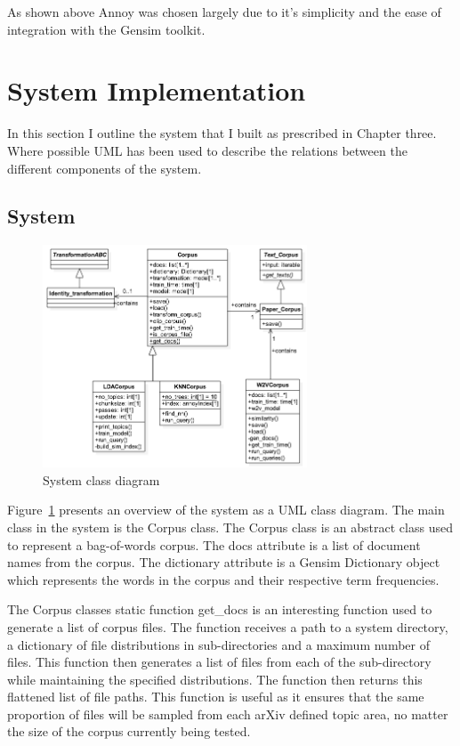 As shown above Annoy was chosen largely due to it's simplicity and the ease of integration with the Gensim toolkit.

\section{System Implementation}
In this section I outline the system that I built as prescribed in Chapter three.
Where possible UML has been used to describe the relations between the different components of the system.

\subsection{System}
\begin{figure}[h]
    \centering
        \includegraphics[width=0.7\textwidth]{Figures/FYPClassDiagram.png}
    \caption{System class diagram}
    \label{fig:UMLClass}
\end{figure}

Figure~\ref{fig:UMLClass} presents an overview of the system as a UML class diagram.
The main class in the system is the Corpus class.
The Corpus class is an abstract class used to represent a bag-of-words corpus.
The docs attribute is a list of document names from the corpus.
The dictionary attribute is a Gensim Dictionary object which represents the words in the corpus and their respective term frequencies.

The Corpus classes static function get\_docs is an interesting function used to generate a list of corpus files.
The function receives a path to a system directory, a dictionary of file distributions in sub-directories and a maximum number of files.
This function then generates a list of files from each of the sub-directory while maintaining the specified distributions.
The function then returns this flattened list of file paths.
This function is useful as it ensures that the same proportion of files will be sampled from each arXiv defined topic area, no matter the size of the corpus currently being tested.

